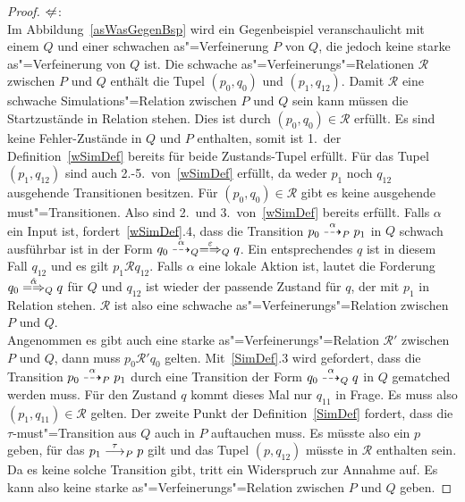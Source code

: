 \begin{proof}
  \glqq $\hspace{0.1cm}\not\hspace{-0.1cm}\Leftarrow$\grqq{}:\\
  Im Abbildung~\ref{asWasGegenBsp} wird ein Gegenbeispiel veranschaulicht mit
  einem \MEIO{} $Q$ und einer schwachen as"=Verfeinerung $P$ von $Q$, die
  jedoch keine starke as"=Verfeinerung von $Q$ ist. Die schwache
  as"=Verfeinerungs"=Relationen $\mathcal{R}$ zwischen $P$ und $Q$ enthält die
  Tupel $(p_0,q_0)$ und $(p_1,q_{12})$. Damit $\mathcal{R}$ eine schwache
  Simulations"=Relation zwischen $P$ und $Q$ sein kann müssen die Startzustände
  in Relation stehen. Dies ist durch $(p_0,q_0)\in \mathcal{R}$ erfüllt.
  Es sind keine Fehler-Zustände in $Q$ und $P$ enthalten, somit ist 1.\ der
  Definition~\ref{wSimDef} bereits für beide Zustands-Tupel erfüllt. Für das
  Tupel $(p_1,q_{12})$ sind auch 2.-5.\ von~\ref{wSimDef} erfüllt, da weder
  $p_1$ noch $q_{12}$ ausgehende Transitionen besitzen. Für $(p_0,q_0)\in
  \mathcal{R}$ gibt es keine ausgehende must"=Transitionen. Also sind 2.\ und
  3.\ von~\ref{wSimDef} bereits erfüllt. Falls $\alpha$ ein Input ist,
  fordert~\ref{wSimDef}.4, dass die Transition $p_0 \may[\alpha]_P p_1$ in $Q$
  schwach ausführbar ist in der Form $q_0 \may[\alpha]_Q
  \weakmay[\varepsilon]_Q q$. Ein entsprechendes $q$ ist in diesem Fall
  $q_{12}$ und es gilt $p_1 \mathcal{R} q_{12}$. Falls $\alpha$ eine lokale
  Aktion ist, lautet die Forderung $q_0 \weakmay[\hat{\alpha}]_Q q$ für $Q$ und
  $q_{12}$ ist wieder der passende Zustand für $q$, der mit $p_1$ in Relation
  stehen. $\mathcal{R}$ ist also eine schwache as"=Verfeinerungs"=Relation
  zwischen $P$ und $Q$.\\
  Angenommen es gibt auch eine starke as"=Verfeinerungs"=Relation
  $\mathcal{R}'$ zwischen $P$ und $Q$, dann muss $p_0 \mathcal{R}' q_0$
  gelten. Mit~\ref{SimDef}.3 wird gefordert, dass die Transition $p_0
  \may[\alpha]_P p_1$ durch eine Transition der Form $q_0 \may[\alpha]_Q q$
  in $Q$ gematched werden muss. Für den Zustand $q$ kommt dieses Mal nur
  $q_{11}$ in Frage. Es muss also $(p_1,q_{11})\in \mathcal{R}$ gelten. Der
  zweite Punkt der Definition~\ref{SimDef} fordert, dass die
  $\tau$-must"=Transition aus $Q$ auch in $P$ auftauchen muss. Es müsste also
  ein $p$ geben, für das $p_1 \must[\tau]_P p$ gilt und das Tupel $(p,q_{12})$
  müsste in $\mathcal{R}$ enthalten sein. Da es keine solche Transition gibt,
  tritt ein Widerspruch zur Annahme auf. Es kann also keine starke
  as"=Verfeinerungs"=Relation zwischen $P$ und $Q$ geben.


\end{proof}
